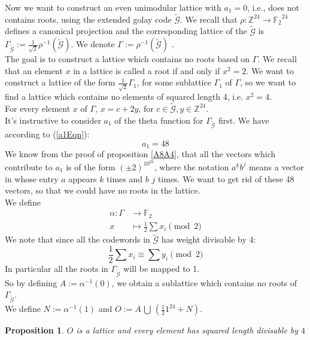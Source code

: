 \documentclass{article}
\newtheorem{prop}[theorem]{Proposition}
\numberwithin{equation}{theorem}
\numberwithin{figure}{theorem}
\newcommand{\Ftwo}{\ensuremath{\mathbb{F}_2}}
\newcommand{\cCodes}{\ensuremath{\widetilde{\mathscr{G}}}}
\newcommand{\buildLattice}[1]{\ensuremath{\Gamma_{#1}}}
\newcommand{\Integer}{\ensuremath{\mathbb{Z}}}
\begin{document}
Now we want to construct an even unimodular lattice with $a_1 = 0$, i.e., does not contains roots, using the extended golay code {\cCodes}.
We recall that $\rho :\Integer^{24} \rightarrow \Ftwo^{24}$ defines a canonical projection and the corresponding lattice of the {\cCodes} is $\buildLattice{\cCodes} := \frac{1}{\sqrt{2}}\rho^{-1}(\cCodes)$. We denote $\Gamma := \rho^{-1}(\cCodes)$ .\\ The goal is to construct a lattice which contains no roots based on $\Gamma$. We recall that an element $x$ in a lattice is called a root if and only if $x^2 = 2$. We want to construct a lattice of the form $\frac{1}{\sqrt{2}}\Gamma_1$, for some sublattice $\Gamma_1$ of $\Gamma$, so we want to find a lattice which contains no elements of squared length 4, i.e. $x^2 = 4$. \\For every element $x$ of $\Gamma$, $x = c + 2y$, for $c \in \cCodes , y\in \Integer^{24}$. \\
It's instructive to consider $a_1$ of the theta function for $\buildLattice{\cCodes}$ first. We have according to (\ref{a1Eqn}):
\[
	a_1 = 48
\]
We know from the proof of proposition \ref{A8A4}, that all the vectors which contribute to $a_1$ is of the form $(\pm2)^10^{23}$, where the notation $a^kb^j$ means a vector in whose entry $a$ appears $k$ times and $b$ $j$ times. We want to get rid of these 48 vectors, so that we could have no roots in the lattice. \\
We define
\begin{align*}
	\alpha: \Gamma &\rightarrow \Ftwo \\
			x &\mapsto \frac{1}{2}\sum{x_i} \pmod 2
\end{align*}
We note that since all the codewords in $\cCodes$ has weight divisable by 4:
\[
\frac{1}{2} \sum{x_i} \equiv \sum{y_i} \pmod 2
\]
In particular all the roots in $\buildLattice{\cCodes}$ will be mapped to 1.\\
So by defining $A:= \alpha^{-1}(0)$, we obtain a sublattice which contains no roots of  $\buildLattice{\cCodes}$. \\
We define $N := \alpha^{-1}(1)$ and $O := A \, \bigcup \,(\frac{1}{2}1^{24} + N)$.
\begin{prop}\label{propLeechPreliminary}
$O$ is a lattice and every element has squared length divisable by $4$
\end{prop}
\end{document}
